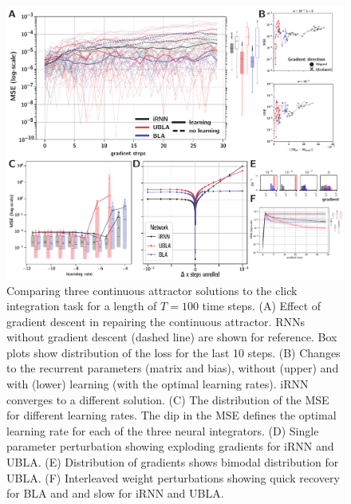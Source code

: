 \documentclass{article} %
\newcounter{ct}
\theoremstyle{definition}
\theoremstyle{remark}
\begin{document}
\begin{figure}[H]
  \centering
  \includegraphics[width=\textwidth]{maintenance_T100.pdf}
  \caption{
  Comparing three continuous attractor solutions to the click integration task for a length of $T=100$ time steps.
  (A) Effect of gradient descent in repairing the continuous attractor. RNNs without gradient descent (dashed line) are shown for reference. Box plots show distribution of the loss for the last 10 steps.
  (B) Changes to the recurrent parameters (matrix and bias), without (upper) and with (lower) learning (with the optimal learning rates). iRNN converges to a different solution.
 (C)  The distribution of the MSE for different learning rates. The dip in the MSE defines the optimal learning rate for each of the three neural integrators. 
    (D) Single parameter perturbation showing exploding gradients for iRNN and UBLA.
  (E) Distribution of gradients shows bimodal distribution for UBLA. %
    (F) Interleaved weight perturbations showing quick recovery for BLA and and slow for iRNN and UBLA.
  }
  \label{fig:maintenance}
\end{figure}
\end{document}
